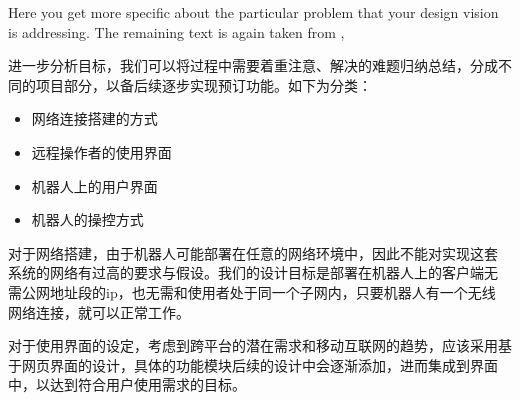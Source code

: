 \begin{remark} \color{blue}
Here you get more specific about the particular problem that your design vision is addressing.
The remaining text is again taken from \cite{Autodesk2008Fall},
\normalcolor
\end{remark}


进一步分析目标，我们可以将过程中需要着重注意、解决的难题归纳总结，分成不同的项目部分，以备后续逐步实现预订功能。如下为分类：

\begin{itemize} \tightlist
\item 网络连接搭建的方式

\item 远程操作者的使用界面

\item 机器人上的用户界面

\item 机器人的操控方式

\end{itemize}




对于网络搭建，由于机器人可能部署在任意的网络环境中，因此不能对实现这套
系统的网络有过高的要求与假设。我们的设计目标是部署在机器人上的客户端无
需公网地址段的ip，也无需和使用者处于同一个子网内，只要机器人有一个无线
网络连接，就可以正常工作。

对于使用界面的设定，考虑到跨平台的潜在需求和移动互联网的趋势，应该采用基于网页界面的设计，具体的功能模块后续的设计中会逐渐添加，进而集成到界面中，以达到符合用户使用需求的目标。


